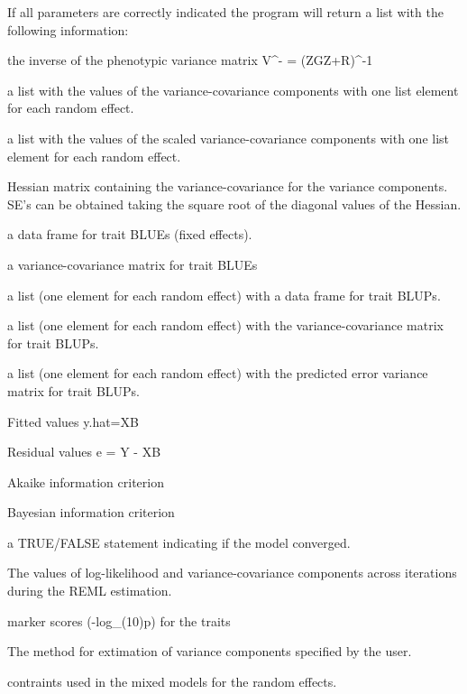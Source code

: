 \documentclass[a4paper]{book}
\begin{document}
\begin{Value}
If all parameters are correctly indicated the program will return a list with the following information:

\begin{ldescription}
\item[\code{Vi}] the inverse of the phenotypic variance matrix V\textasciicircum{}- = (ZGZ+R)\textasciicircum{}-1
\item[\code{sigma}] a list with the values of the variance-covariance components with one list element for each random effect.
\item[\code{sigma\_scaled}] a list with the values of the scaled variance-covariance components with one list element for each random effect.
\item[\code{sigmaSE}] Hessian matrix containing the variance-covariance for the variance components. SE's can be obtained taking the square root of the diagonal values of the Hessian.
\item[\code{Beta}] a data frame for trait BLUEs (fixed effects).
\item[\code{VarBeta}] a variance-covariance matrix for trait BLUEs
\item[\code{U}] a list (one element for each random effect) with a data frame for trait BLUPs.
\item[\code{VarU}] a list (one element for each random effect) with the variance-covariance matrix for trait BLUPs.
\item[\code{PevU}] a list (one element for each random effect) with the predicted error variance matrix for trait BLUPs.
\item[\code{fitted}]  Fitted values y.hat=XB
\item[\code{residuals}] Residual values e = Y - XB
\item[\code{AIC}] Akaike information criterion
\item[\code{BIC}] Bayesian information criterion
\item[\code{convergence}] a TRUE/FALSE statement indicating if the model converged.
\item[\code{monitor}] The values of log-likelihood and variance-covariance components across iterations during the REML estimation.
\item[\code{scores}]  marker scores (-log\_(10)p) for the traits
\item[\code{method}] The method for extimation of variance components specified by the user.
\item[\code{constraints}] contraints used in the mixed models for the random effects.

\end{ldescription}
\end{Value}
\end{document}
